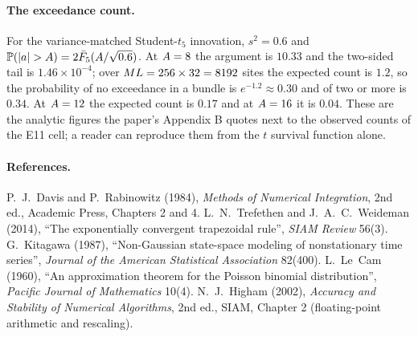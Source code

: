 \paragraph{The exceedance count.}
For the variance-matched Student-$t_5$ innovation, $s^2=0.6$ and
$\Prob(|a|>\halfwidth)=2\bar F_5(\halfwidth/\sqrt{0.6})$. At $A=8$ the argument is
$10.33$ and the two-sided tail is $1.46\times10^{-4}$; over $ML=256\times32=8192$
sites the expected count is $1.2$, so the probability of no exceedance in a bundle is
$e^{-1.2}\approx0.30$ and of two or more is $0.34$. At $A=12$ the expected
count is $0.17$ and at $A=16$ it is $0.04$. These are the analytic figures the
paper's Appendix B quotes next to the observed counts of the E11 cell; a reader can
reproduce them from the $t$ survival function alone.


\paragraph{References.}
P.~J.~Davis and P.~Rabinowitz (1984), \emph{Methods of Numerical Integration}, 2nd ed.,
Academic Press, Chapters 2 and 4.
L.~N.~Trefethen and J.~A.~C.~Weideman (2014), ``The exponentially convergent trapezoidal
rule'', \emph{SIAM Review} 56(3).
G.~Kitagawa (1987), ``Non-Gaussian state-space modeling of nonstationary time series'',
\emph{Journal of the American Statistical Association} 82(400).
L.~Le~Cam (1960), ``An approximation theorem for the Poisson binomial distribution'',
\emph{Pacific Journal of Mathematics} 10(4).
N.~J.~Higham (2002), \emph{Accuracy and Stability of Numerical Algorithms}, 2nd ed., SIAM,
Chapter 2 (floating-point arithmetic and rescaling).
